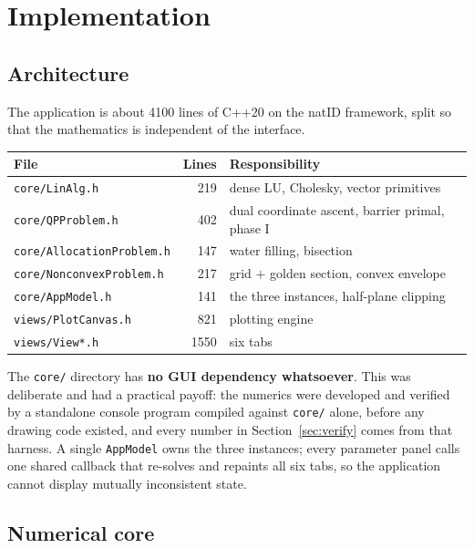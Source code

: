 \documentclass[11pt,a4paper]{article}
\theoremstyle{definition}
\begin{document}
\section{Implementation}\label{sec:impl}

\subsection{Architecture}

The application is about 4100 lines of C++20 on the natID framework, split so that the
mathematics is independent of the interface.

\begin{center}
\begin{tabular}{lrl}
\toprule
\textbf{File} & \textbf{Lines} & \textbf{Responsibility}\\
\midrule
\texttt{core/LinAlg.h}             & 219  & dense LU, Cholesky, vector primitives\\
\texttt{core/QPProblem.h}          & 402  & dual coordinate ascent, barrier primal, phase I\\
\texttt{core/AllocationProblem.h}  & 147  & water filling, bisection\\
\texttt{core/NonconvexProblem.h}   & 217  & grid $+$ golden section, convex envelope\\
\texttt{core/AppModel.h}           & 141  & the three instances, half-plane clipping\\
\texttt{views/PlotCanvas.h}        & 821  & plotting engine\\
\texttt{views/View*.h}             & 1550 & six tabs\\
\bottomrule
\end{tabular}
\end{center}

The \texttt{core/} directory has \textbf{no GUI dependency whatsoever}. This was deliberate and
had a practical payoff: the numerics were developed and verified by a standalone console program
compiled against \texttt{core/} alone, before any drawing code existed, and every number in
Section~\ref{sec:verify} comes from that harness. A single \texttt{AppModel} owns the three
instances; every parameter panel calls one shared callback that re-solves and repaints all six
tabs, so the application cannot display mutually inconsistent state.

\subsection{Numerical core}
\end{document}
